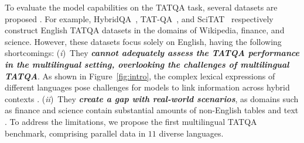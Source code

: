To evaluate the model capabilities on the TATQA task, several datasets are proposed \cite{li2021tsqa,chen-etal-2021-finqa,zhao-etal-2024-docmath}. 
For example, HybridQA~\cite{chen-etal-2020-hybridqa}, TAT-QA~\cite{zhu-etal-2021-tat}, and SciTAT~\cite{zhang2024scitat} respectively construct English TATQA datasets in the domains of Wikipedia, finance, and science. 
However, these datasets focus solely on English, having the following shortcomings:
(\emph{i})~They \textbf{\textit{cannot adequately assess the TATQA performance in the multilingual setting, overlooking the challenges of multilingual TATQA}}.
As shown in Figure~\ref{fig:intro}, the complex lexical expressions of different languages pose challenges for models to link information across hybrid contexts \cite{MultiSpider}.
(\emph{ii})~They \textbf{\textit{create a gap with real-world scenarios}}, as domains such as finance and science contain substantial amounts of non-English tables and text \cite{hamotskyi-etal-2024-fincorpus,angulo2021non-English-scientific,bhagavatula-etal-2012-language-wiki}.
To address the limitations, 
we propose the first multilingual TATQA benchmark, comprising parallel data in $11$ diverse languages.


